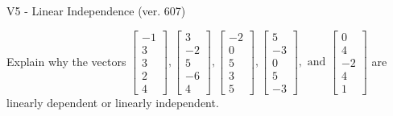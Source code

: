 \begin{exercise}
  \begin{exerciseTitle}V5 - Linear Independence (ver. 607)\end{exerciseTitle}
  \begin{exerciseStatement}
    Explain why the vectors \(\left[\begin{array}{r}
-1 \\
3 \\
3 \\
2 \\
4
\end{array}\right] , \left[\begin{array}{r}
3 \\
-2 \\
5 \\
-6 \\
4
\end{array}\right] , \left[\begin{array}{r}
-2 \\
0 \\
5 \\
3 \\
5
\end{array}\right] , \left[\begin{array}{r}
5 \\
-3 \\
0 \\
5 \\
-3
\end{array}\right] , \text{ and } \left[\begin{array}{r}
0 \\
4 \\
-2 \\
4 \\
1
\end{array}\right]\) are linearly dependent or linearly independent.	



\end{exerciseStatement}
\end{exercise}
